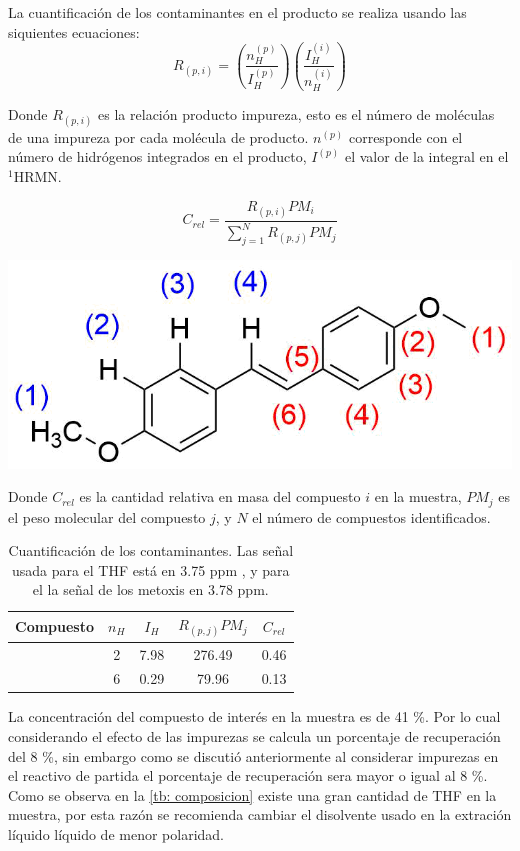 \documentclass[fleqn,11pt]{SelfArx}
\begin{document}
La cuantificaci\'on de los contaminantes en el producto se realiza usando las siquientes ecuaciones:
\begin{equation}
	R_{(p, i)} = \left(\dfrac{n_H^{(p)}}{I_H^{(p)}}\right)\left(\dfrac{I_H^{(i)}}{n_H^{(i)}}\right)
\end{equation}

\pagebreak
Donde $R_{(p, i)}$ es la relaci\'on producto impureza, esto es el n\'umero de mol\'eculas de una impureza por cada mol\'ecula de producto. $n^{(p)}$ corresponde con el n\'umero de hidr\'ogenos integrados en el producto, $I^{(p)}$ el valor de la integral en el $^1$HRMN.

\begin{equation}
	C_{rel} = \dfrac{R_{(p, i)}PM_{i}}{\sum\limits_{j=1}^N R_{(p, j)}PM_{j}}
\end{equation}
\begin{scheme}[h]
	\centering
	\includegraphics[width=0.7\linewidth]{structures/RMN.png}
	\caption{Asignaci\'on de señales de RMN, en azul se enumeran los protones y en rojo los carbonos.}
\end{scheme}

Donde $C_{rel}$ es la cantidad relativa en masa del compuesto $i$ en la muestra, $PM_j$ es el peso molecular del compuesto $j$, y $N$ el n\'umero de compuestos identificados.
\begin{table}[h]
	\centering
	\caption{Cuantificaci\'on de los contaminantes. Las señal usada para el THF est\'a en 3.75 ppm \cite{Fulmer2010}, y para el  la señal de los metoxis en 3.78 ppm.}
	\begin{tabular}{ccccc}
		\hline
		\textbf{Compuesto} & $n_H$ & $I_H$ & $R_{(p, j)}PM_j$ & $C_{rel}$ \\
		\hline
		\ce{THF} & 2 & 7.98 & 276.49 & 0.46 \\
		\ce{C16H18O4} & 6 & 0.29 & 79.96 & 0.13 \\
		\hline
	\end{tabular}
	\label{tb: composicion}
\end{table}

La concentraci\'on del compuesto de inter\'es en la muestra es de 41 \%. Por lo cual considerando el efecto de las impurezas se calcula un porcentaje de recuperaci\'on del 8 \%, sin embargo como se discuti\'o anteriormente al considerar impurezas en el reactivo de partida el porcentaje de recuperaci\'on sera mayor o igual al 8 \%. Como se observa en la \autoref{tb: composicion} existe una gran cantidad de THF en la muestra, por esta raz\'on se recomienda cambiar el disolvente usado en la extraci\'on l\'iquido l\'iquido de menor polaridad.  
\end{document}
